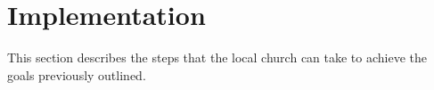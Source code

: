 
\section{Implementation}

This section describes the steps that the local church can take to achieve the goals previously outlined.




